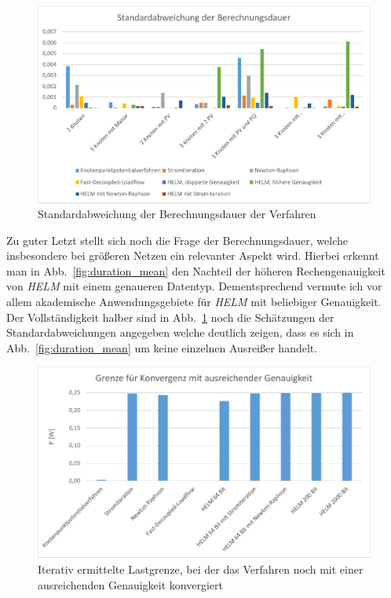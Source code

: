 \documentclass[12pt,a4paper]{article}
\newcommand{\reffig}[1]{{Abb.~\ref{fig:#1}}}
\begin{document}
	\begin{figure}
		\centering
		\includegraphics[scale=0.8]{pictures/duration_deviation}
		\caption{Standardabweichung der Berechnungsdauer der Verfahren}
		\label{fig:duration_deviation}
	\end{figure}
	
	Zu guter Letzt stellt sich noch die Frage der Berechnungsdauer, welche insbesondere bei größeren Netzen ein relevanter Aspekt wird. Hierbei erkennt man in \reffig{duration_mean} den Nachteil der höheren Rechengenauigkeit von \emph{HELM} mit einem genaueren Datentyp. Dementsprechend vermute ich vor allem akademische Anwendungsgebiete für \emph{HELM} mit beliebiger Genauigkeit. Der Vollständigkeit halber sind in \reffig{duration_deviation} noch die Schätzungen der Standardabweichungen angegeben welche deutlich zeigen, dass es sich in \reffig{duration_mean} um keine einzelnen Ausreißer handelt.
	
	\begin{figure}
		\centering
		\includegraphics[scale=0.8]{pictures/convergence_border_1}
		\caption{Iterativ ermittelte Lastgrenze, bei der das Verfahren noch mit einer ausreichenden Genauigkeit konvergiert}
		\label{fig:convergence_border_1}
	\end{figure}
	
\end{document}
